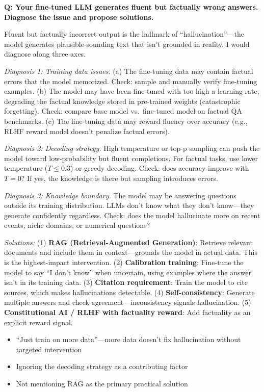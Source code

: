 \begin{interviewq}
\textbf{Q: Your fine-tuned LLM generates fluent but factually wrong answers. Diagnose the issue and propose solutions.}

 \quad {} \quad \badgefreq{\freqhigh}

\stronganswer Fluent but factually incorrect output is the hallmark of ``hallucination''---the model generates plausible-sounding text that isn't grounded in reality. I would diagnose along three axes.

\textit{Diagnosis 1: Training data issues.} (a) The fine-tuning data may contain factual errors that the model memorized. Check: sample and manually verify fine-tuning examples. (b) The model may have been fine-tuned with too high a learning rate, degrading the factual knowledge stored in pre-trained weights (catastrophic forgetting). Check: compare base model vs.\ fine-tuned model on factual QA benchmarks. (c) The fine-tuning data may reward fluency over accuracy (e.g., RLHF reward model doesn't penalize factual errors).

\textit{Diagnosis 2: Decoding strategy.} High temperature or top-p sampling can push the model toward low-probability but fluent completions. For factual tasks, use lower temperature ($T \leq 0.3$) or greedy decoding. Check: does accuracy improve with $T=0$? If yes, the knowledge is there but sampling introduces errors.

\textit{Diagnosis 3: Knowledge boundary.} The model may be answering questions outside its training distribution. LLMs don't know what they don't know---they generate confidently regardless. Check: does the model hallucinate more on recent events, niche domains, or numerical questions?

\textit{Solutions:} (1) \textbf{RAG (Retrieval-Augmented Generation)}: Retrieve relevant documents and include them in context---grounds the model in actual data. This is the highest-impact intervention. (2) \textbf{Calibration training}: Fine-tune the model to say ``I don't know'' when uncertain, using examples where the answer isn't in its training data. (3) \textbf{Citation requirement}: Train the model to cite sources, which makes hallucinations detectable. (4) \textbf{Self-consistency}: Generate multiple answers and check agreement---inconsistency signals hallucination. (5) \textbf{Constitutional AI / RLHF with factuality reward}: Add factuality as an explicit reward signal.

\redflags
\begin{itemize}
    \item ``Just train on more data''---more data doesn't fix hallucination without targeted intervention
    \item Ignoring the decoding strategy as a contributing factor
    \item Not mentioning RAG as the primary practical solution
\end{itemize}


\end{interviewq}
